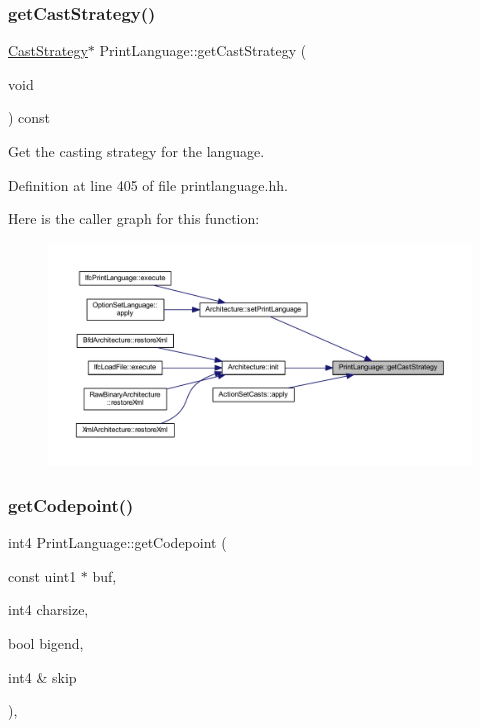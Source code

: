 \subsubsection{\texorpdfstring{getCastStrategy()}{getCastStrategy()}}
{\footnotesize\ttfamily \mbox{\hyperlink{class_cast_strategy}{Cast\+Strategy}}$\ast$ Print\+Language\+::get\+Cast\+Strategy (\begin{DoxyParamCaption}\item[{void}]{ }\end{DoxyParamCaption}) const\hspace{0.3cm}{\ttfamily [inline]}}



Get the casting strategy for the language. 



Definition at line 405 of file printlanguage.\+hh.

Here is the caller graph for this function\+:
\nopagebreak
\begin{figure}[H]
\begin{center}
\leavevmode
\includegraphics[width=350pt]{class_print_language_a56045dfbcc3c6739918ec60e248574c7_icgraph}
\end{center}
\end{figure}
\mbox{\label{class_print_language_a65d1b23870f188666f78341d474c4fe1}} 
\subsubsection{\texorpdfstring{getCodepoint()}{getCodepoint()}}
{\footnotesize\ttfamily int4 Print\+Language\+::get\+Codepoint (\begin{DoxyParamCaption}\item[{const uint1 $\ast$}]{buf,  }\item[{int4}]{charsize,  }\item[{bool}]{bigend,  }\item[{int4 \&}]{skip }\end{DoxyParamCaption})\hspace{0.3cm}{\ttfamily [static]}, {\ttfamily [protected]}}



